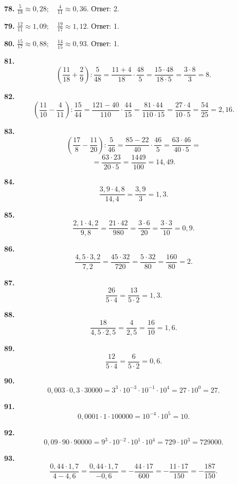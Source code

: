 \textbf{78.} $\frac{5}{18}\approx0,28;\quad\frac{4}{11}\approx0,36$. \newline \null \hspace*{\fill} Ответ: 2. 

\textbf{79.} $\frac{12}{11}\approx1,09;\quad\frac{19}{17}\approx1,12$. \newline \null \hspace*{\fill} Ответ: 1. 

\textbf{80.} $\frac{15}{17}\approx0,88;\quad\frac{14}{15}\approx0,93$. \newline \null \hspace*{\fill} Ответ: 1. 

\newpage \textbf{81.} $$\left(\frac{11}{18}+\frac{2}{9}\right):\frac{5}{48}=\frac{11+4}{18}\cdot\frac{48}{5}=\frac{15\cdot48}{18\cdot5}=\frac{3\cdot8}{3}=8.$$

\textbf{82.} $$\left(\frac{11}{10}-\frac{4}{11}\right):\frac{15}{44}=\frac{121-40}{110}\cdot\frac{44}{15}=\frac{81\cdot44}{110\cdot15}=\frac{27\cdot4}{10\cdot5}=\frac{54}{25}=2,16.$$

\textbf{83.} $$\left(\frac{17}{8}-\frac{11}{20}\right):\frac{5}{46}=\frac{85-22}{40}\cdot\frac{46}{5}=\frac{63\cdot46}{40\cdot5}=$$ $$=\frac{63\cdot23}{20\cdot5}=\frac{1449}{100}=14,49.$$

\textbf{84.} $$\frac{3,9\cdot4,8}{14,4}=\frac{3,9}{3}=1,3.$$

\textbf{85.} $$\frac{2,1\cdot4,2}{9,8}=\frac{21\cdot42}{980}=\frac{3\cdot6}{20}=\frac{3\cdot3}{10}=0,9.$$

\textbf{86.} $$\frac{4,5\cdot3,2}{7,2}=\frac{45\cdot32}{720}=\frac{5\cdot32}{80}=\frac{160}{80}=2.$$

\textbf{87.} $$\frac{26}{5\cdot4}=\frac{13}{5\cdot2}=1,3.$$

\textbf{88.} $$\frac{18}{4,5\cdot2,5}=\frac{4}{2,5}=\frac{16}{10}=1,6.$$

\textbf{89.} $$\frac{12}{5\cdot4}=\frac{6}{5\cdot2}=0,6.$$

\textbf{90.} $$0,003\cdot0,3\cdot30000=3^3\cdot10^{-3}\cdot10^{-1}\cdot10^4=27\cdot10^0=27.$$

\textbf{91.} $$0,0001\cdot1\cdot100000=10^{-4}\cdot10^5=10.$$

\textbf{92.} $$0,09\cdot90\cdot90000=9^3\cdot10^{-2}\cdot10^1\cdot10^4=729\cdot10^3=729000.$$

\textbf{93.} $$\frac{0,44\cdot1,7}{4-4,6}=\frac{0,44\cdot1,7}{-0,6}=-\frac{44\cdot17}{600}=-\frac{11\cdot17}{150}=-\frac{187}{150}.$$

